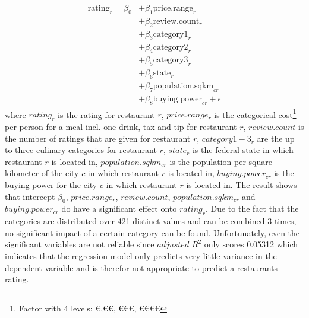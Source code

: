 \begin{equation}
	\begin{aligned}
	\mathrm{rating}_{r} = \beta_{0}
	&+ \beta_{1}  \mathrm{price.range}_{r} \\
	&+ \beta_{2}  \mathrm{review.count}_{r} \\
	&+ \beta_{3}  \mathrm{category1}_{r}    \\
	&+ \beta_{4}  \mathrm{category2}_{r} \\
	&+ \beta_{5}  \mathrm{category3}_{r} \\
	&+ \beta_{6}  \mathrm{state}_{r}   \\
	&+ \beta_{7}  \mathrm{population.sqkm}_{cr}  \\
	&+ \beta_{8}  \mathrm{buying.power}_{cr} + \epsilon
	\end{aligned}
	\label{eq:rating_regression}
\end{equation}
where $rating_r$ is the rating for restaurant $r$, $price.range_r$ is the categorical cost\footnote{Factor with 4 levels: \euro,\euro\euro, \euro\euro\euro, \euro\euro\euro\euro} per person for a meal incl. one drink, tax and tip for restaurant $r$, $review.count$ is the number of ratings that are given for restaurant $r$, $category1-3_r$ are the up to three culinary categories for restaurant $r$, $state_r$ is the federal state in which restaurant $r$ is located in, $population.sqkm_{cr}$ is the population per square kilometer of the city $c$ in which restaurant $r$ is located in, $buying.power_{cr}$ is the buying power for the city $c$ in which restaurant $r$ is located in. \newline
The result shows that  intercept $\beta_{0}$, $price.range_r$, $review.count$, $population.sqkm_{cr}$ and
$buying.power_{cr}$ do have a significant effect onto $rating_r$. Due to the fact that the categories are distributed over 421 distinct values and can be combined 3 times, no significant impact of a certain category can be found. Unfortunately, even the significant variables are not reliable since $adjusted$ $ R^2$ only scores 0.05312 which indicates that the regression model only predicts very little variance in the dependent variable and is therefor not appropriate to predict a restaurants rating.


